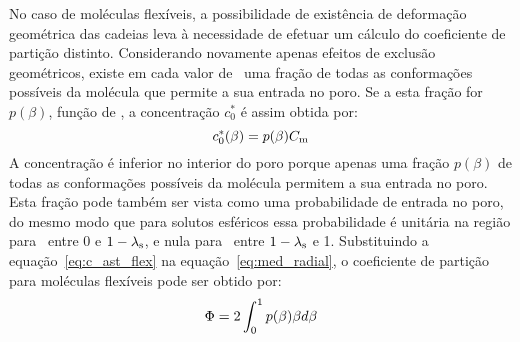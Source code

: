No caso de moléculas flexíveis, a possibilidade de existência de deformação geométrica das cadeias leva à necessidade de efetuar um cálculo do coeficiente de partição distinto. Considerando novamente apenas efeitos de exclusão geométricos, existe em cada valor de \radialadimensional\ uma fração de todas as conformações possíveis da molécula que permite a sua entrada no poro. Se a esta fração for $p(\beta)$, função de \radialadimensional, a concentração $c_0^{\ast}$ é assim obtida por:
%
\begin{equation}
	\label{eq:c_ast_flex}
	c_0^{\ast}(\beta) = p(\beta)C_{\mathrm{m}}
\end{equation}%
%
A concentração é inferior no interior do poro porque apenas uma fração $p(\beta)$ de todas as conformações possíveis da molécula permitem a sua entrada no poro. Esta fração pode também ser vista como uma probabilidade de entrada no poro, do mesmo modo que para solutos esféricos essa probabilidade é unitária na região para \radialadimensional\ entre 0 e $1-\lambda_{\mathrm{s}}$, e nula para \radialadimensional\ entre $1-\lambda_{\mathrm{s}}$ e 1. Substituindo a equação~\ref{eq:c_ast_flex} na equação~\ref{eq:med_radial}, o coeficiente de partição para moléculas flexíveis pode ser obtido por:
%
\begin{equation}
	\label{eq:fi_flex}
	\Phi = 2\int_0^{1}p(\beta)\beta d\beta
\end{equation}
%

